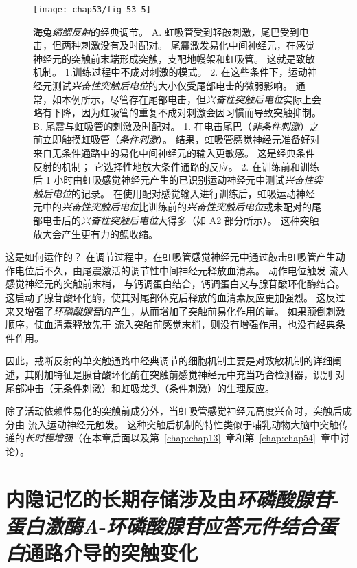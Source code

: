 \begin{figure}[htbp]
	\centering
	\texttt{[image: chap53/fig\_53\_5]}
	\caption{海兔\textit{缩鳃反射}的经典调节\cite{hawkins1983cellular}。
		A. 虹吸管受到轻敲刺激，尾巴受到电击，但两种刺激没有及时配对。
		尾震激发易化中间神经元，在感觉神经元的突触前末端形成突触，支配地幔架和虹吸管。
		这就是致敏机制。
		1.训练过程中不成对刺激的模式。
		2. 在这些条件下，运动神经元测试\textit{兴奋性突触后电位}的大小仅受尾部电击的微弱影响。
		通常，如本例所示，尽管存在尾部电击，但\textit{兴奋性突触后电位}实际上会略有下降，因为虹吸管的重复不成对刺激会因习惯而导致突触抑制。
		B. 尾震与虹吸管的刺激及时配对。
		1. 在电击尾巴（\textit{非条件刺激}）之前立即触摸虹吸管（\textit{条件刺激}）。
		结果，虹吸管感觉神经元准备好对来自无条件通路中的易化中间神经元的输入更敏感。
		这是经典条件反射的机制；
		它选择性地放大条件通路的反应。
		2. 在训练前和训练后 1 小时由虹吸感觉神经元产生的已识别运动神经元中测试\textit{兴奋性突触后电位}的记录。
		在使用配对感觉输入进行训练后，虹吸运动神经元中的\textit{兴奋性突触后电位}比训练前的\textit{兴奋性突触后电位}或未配对的尾部电击后的\textit{兴奋性突触后电位}大得多（如 A2 部分所示）。
		这种突触放大会产生更有力的鳃收缩。}
	\label{fig:53_5}
\end{figure}


这是如何运作的？
在调节过程中，在虹吸管感觉神经元中通过敲击虹吸管产生动作电位后不久，由尾震激活的调节性中间神经元释放血清素。
动作电位触发  流入感觉神经元的突触前末梢， 与钙调蛋白结合，钙调蛋白又与腺苷酸环化酶结合。
这启动了腺苷酸环化酶，使其对尾部休克后释放的血清素反应更加强烈。
这反过来又增强了\textit{环磷酸腺苷}的产生，从而增加了突触前易化作用的量。
如果颠倒刺激顺序，使血清素释放先于  流入突触前感觉末梢，则没有增强作用，也没有经典条件作用。


因此，戒断反射的单突触通路中经典调节的细胞机制主要是对致敏机制的详细阐述，其附加特征是腺苷酸环化酶在突触前感觉神经元中充当巧合检测器，识别 对尾部冲击（无条件刺激）和虹吸龙头（条件刺激）的生理反应。


除了活动依赖性易化的突触前成分外，当虹吸管感觉神经元高度兴奋时，突触后成分由  流入运动神经元触发。
这种突触后机制的特性类似于哺乳动物大脑中突触传递的\textit{长时程增强}（在本章后面以及第~\ref{chap:chap13}~章和第~\ref{chap:chap54}~章中讨论）。



\section{内隐记忆的长期存储涉及由\textit{环磷酸腺苷}-\textit{蛋白激酶A}-\textit{环磷酸腺苷应答元件结合蛋白}通路介导的突触变化}

